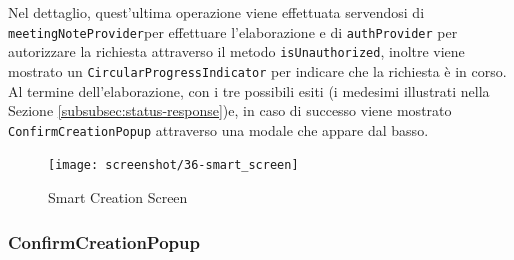 Nel dettaglio, quest'ultima operazione viene effettuata servendosi di \lstinline{meetingNoteProvider}per effettuare l'elaborazione e di \lstinline{authProvider} per autorizzare la richiesta attraverso il metodo \lstinline{isUnauthorized}, inoltre viene mostrato un \lstinline{CircularProgressIndicator} \cite{site:circular-progress-indicator} per indicare che la richiesta è in corso. \\
Al termine dell'elaborazione, con i tre possibili esiti (i medesimi illustrati nella Sezione \ref{subsubsec:status-response})e, in caso di successo viene mostrato \lstinline{ConfirmCreationPopup} attraverso una modale che appare dal basso.

\begin{figure}[!h] 
    \centering 
    \texttt{[image: screenshot/36-smart\_screen]} 
    \caption{Smart Creation Screen}
    \label{fig:smart-screen}
\end{figure}

\subsubsection*{ConfirmCreationPopup}
\label{subsubsec:confirm-creation-popup}

